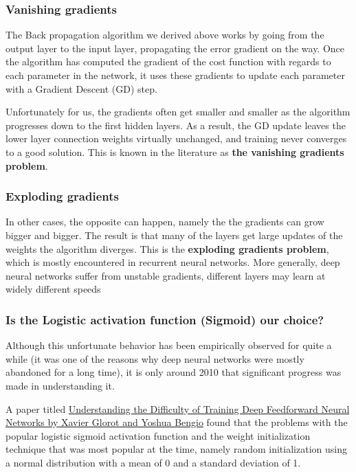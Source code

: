 \documentclass{beamer}
\begin{document}
\begin{frame}
\frametitle{Vanishing gradients}

The Back propagation algorithm we derived above works by going from
the output layer to the input layer, propagating the error gradient on
the way. Once the algorithm has computed the gradient of the cost
function with regards to each parameter in the network, it uses these
gradients to update each parameter with a Gradient Descent (GD) step.

Unfortunately for us, the gradients often get smaller and smaller as
the algorithm progresses down to the first hidden layers. As a result,
the GD update leaves the lower layer connection weights virtually
unchanged, and training never converges to a good solution. This is
known in the literature as \textbf{the vanishing gradients problem}.
\end{frame}

\begin{frame}
\frametitle{Exploding gradients}

In other cases, the opposite can happen, namely the the gradients can
grow bigger and bigger. The result is that many of the layers get
large updates of the weights the algorithm diverges. This is the
\textbf{exploding gradients problem}, which is mostly encountered in
recurrent neural networks. More generally, deep neural networks suffer
from unstable gradients, different layers may learn at widely
different speeds
\end{frame}

\begin{frame}
\frametitle{Is the Logistic activation function (Sigmoid)  our choice?}

Although this unfortunate behavior has been empirically observed for
quite a while (it was one of the reasons why deep neural networks were
mostly abandoned for a long time), it is only around 2010 that
significant progress was made in understanding it.

A paper titled \href{{http://proceedings.mlr.press/v9/glorot10a.html}}{Understanding the Difficulty of Training Deep
Feedforward Neural Networks by Xavier Glorot and Yoshua Bengio} found that
the problems with the popular logistic
sigmoid activation function and the weight initialization technique
that was most popular at the time, namely random initialization using
a normal distribution with a mean of 0 and a standard deviation of
1.
\end{frame}
\end{document}

